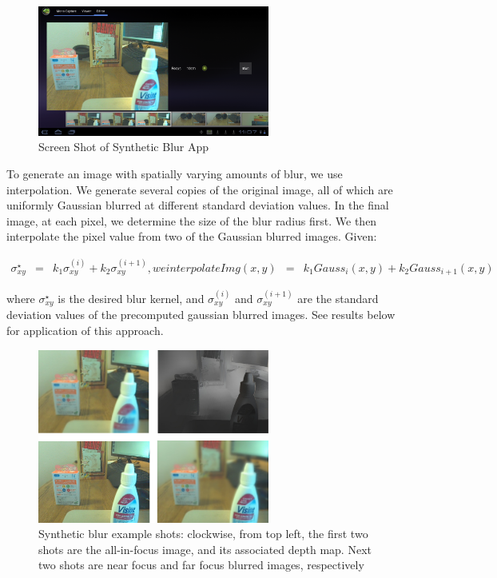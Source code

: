 \documentclass[annual, 12pt]{acmsiggraph}
\begin{document}
\begin{figure}
\centering
\includegraphics[width=3in]{images/synthetic-blur-screenshot.png}
\caption{Screen Shot of Synthetic Blur App}
\label{fig:synthetic-blur-shot}
\end{figure}

To generate an image with spatially varying amounts of blur, we use interpolation. We generate several copies of the original image, all of which are uniformly Gaussian blurred at different standard deviation values. In the final image, at each pixel, we determine the size of the blur radius first. We then interpolate the pixel value from two of the Gaussian blurred images. Given: 

\begin{eqnarray} 
\sigma_{xy}^{\star}&=&k_{1}\sigma_{xy}^{(i)}+k_{2}\sigma_{xy}^{(i+1)}, we interpolate
Img(x,y)&=&k_{1}Gauss_{i}(x,y)+k_{2}Gauss_{i+1}(x,y)
\end{eqnarray}

where $\sigma_{xy}^{\star}$ is the desired blur kernel, and $\sigma_{xy}^{(i)}$ and $\sigma_{xy}^{(i+1)}$ are the standard deviation values of the precomputed gaussian blurred images. See results below for application of this approach.

\begin{figure}
\centering
\includegraphics[width=3in]{images/synthetic-blur-example.png}
\caption{Synthetic blur example shots: clockwise, from top left, the first two shots are the all-in-focus image, and its associated depth map. Next two shots are near focus and far focus blurred images, respectively}
\label{fig:synthetic-blur-ex}
\end{figure}
\end{document}
